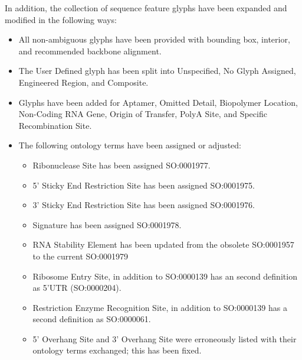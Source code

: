 In addition, the collection of sequence feature glyphs have been expanded and modified in the following ways:
\begin{itemize}
\item All non-ambiguous glyphs have been provided with bounding box, interior, and recommended backbone alignment.
\item The User Defined glyph has been split into Unspecified, No Glyph Assigned, Engineered Region, and Composite. 
\item Glyphs have been added for Aptamer, Omitted Detail, Biopolymer Location, Non-Coding RNA Gene, Origin of Transfer, PolyA Site, and Specific Recombination Site.
\item The following ontology terms have been assigned or adjusted: 
	\begin{itemize}
	\item Ribonuclease Site has been assigned SO:0001977.
	\item 5' Sticky End Restriction Site has been assigned SO:0001975.
	\item 3' Sticky End Restriction Site has been assigned SO:0001976.
	\item Signature has been assigned SO:0001978.
	\item RNA Stability Element has been updated from the obsolete SO:0001957 to the current SO:0001979
	\item Ribosome Entry Site, in addition to SO:0000139 has an second definition as 5'UTR (SO:0000204).
	\item Restriction Enzyme Recognition Site, in addition to SO:0000139 has a second definition as SO:0000061.
	\item 5' Overhang Site and 3' Overhang Site were erroneously listed with their ontology terms exchanged; this has been fixed.
	\end{itemize}
\end{itemize}
